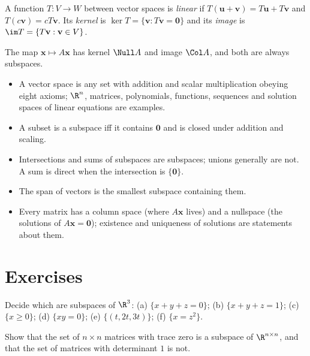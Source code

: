 \begin{definition}
A function $T:V\to W$ between vector spaces is \emph{linear} if $T(\mathbf{u}+\mathbf{v})=T\mathbf{u}+T\mathbf{v}$ and $T(c\mathbf{v})=cT\mathbf{v}$. Its \emph{kernel} is $\ker T=\{\mathbf{v}:T\mathbf{v}=\mathbf{0}\}$ and its \emph{image} is $\im T=\{T\mathbf{v}:\mathbf{v}\in V\}$.
\end{definition}

The map $\mathbf{x}\mapsto A\mathbf{x}$ has kernel $\Null A$ and image $\Col A$, and both are always subspaces.

\begin{summarybox}
\begin{itemize}
  \item A vector space is any set with addition and scalar multiplication obeying eight axioms; $\R^n$, matrices, polynomials, functions, sequences and solution spaces of linear equations are examples.
  \item A subset is a subspace iff it contains $\mathbf{0}$ and is closed under addition and scaling.
  \item Intersections and sums of subspaces are subspaces; unions generally are not. A sum is direct when the intersection is $\{\mathbf{0}\}$.
  \item The span of vectors is the smallest subspace containing them.
  \item Every matrix has a column space (where $A\mathbf{x}$ lives) and a nullspace (the solutions of $A\mathbf{x}=\mathbf{0}$); existence and uniqueness of solutions are statements about them.
\end{itemize}
\end{summarybox}

\section{Exercises}

\begin{exercise}
Decide which are subspaces of $\R^3$: (a) $\{x+y+z=0\}$; (b) $\{x+y+z=1\}$; (c) $\{x\ge0\}$; (d) $\{xy=0\}$; (e) $\{(t,2t,3t)\}$; (f) $\{x=z^2\}$.
\end{exercise}

\begin{exercise}
Show that the set of $n\times n$ matrices with trace zero is a subspace of $\R^{n\times n}$, and that the set of matrices with determinant $1$ is not.
\end{exercise}

